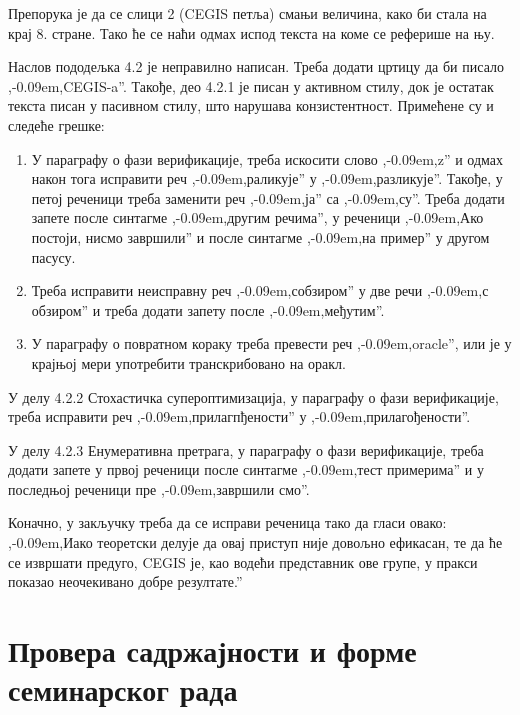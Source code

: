 \documentclass[a4paper]{report}
\def\zn{,\kern-0.09em,}
\begin{document}
\par Препорука је да се слици 2 (CEGIS петља) смањи величина, како би стала на крај 8. стране. Тако ће се наћи одмах испод текста на коме се реферише на њу.

\par Наслов пододељка 4.2 је неправилно написан. Треба додати цртицу да би писало \zn CEGIS-a''. Такође, део 4.2.1 је писан у активном стилу, док је остатак текста писан у пасивном стилу, што нарушава конзистентност. Примећене су и следеће грешке:
\begin{enumerate}
\item У параграфу о фази верификације, треба искосити слово \zn z'' и одмах након тога исправити реч \zn раликује'' у \zn разликује''. Такође, у петој реченици треба заменити реч \zn ја'' са \zn су''. Треба додати запете после синтагме \zn другим речима'', у реченици \zn Ако постоји, нисмо завршили'' и после синтагме \zn на пример'' у другом пасусу.
\item Треба исправити неисправну реч \zn собзиром'' у две речи \zn с обзиром'' и треба додати запету после \zn међутим''.
\item У параграфу о повратном кораку треба превести реч \zn oracle'', или је у крајњој мери употребити транскрибовано на оракл.
\end{enumerate}

\par У делу 4.2.2 Стохастичка супероптимизација, у параграфу о фази верификације, треба исправити реч \zn прилагпђености'' у \zn прилагођености''.

\par У делу 4.2.3 Енумеративна претрага, у параграфу о фази верификације, треба додати запете у првој реченици после синтагме \zn тест примерима'' и у последњој реченици пре \zn завршили смо''.

\par Коначно, у закључку треба да се исправи реченица тако да гласи овако: \zn Иако теоретски делује да овај приступ није довољно ефикасан, те да ће се извршати предуго, CEGIS је, као водећи представник ове групе, у пракси показао неочекивано добре резултате.''

\section{Провера садржајности и форме семинарског рада}
\end{document}
